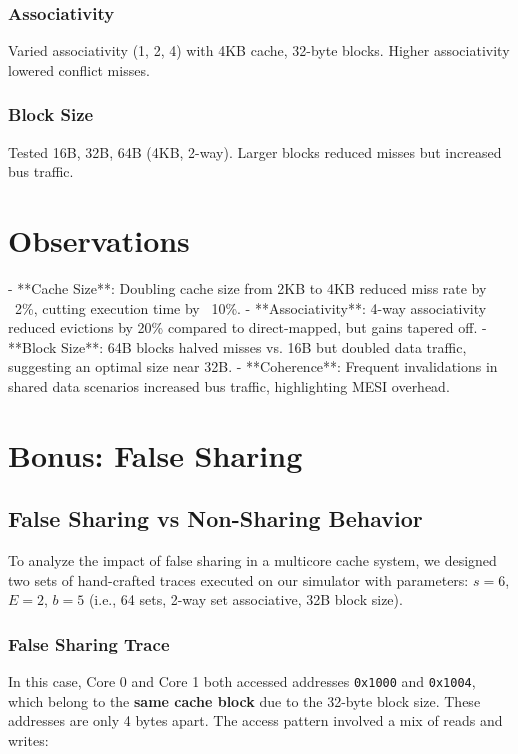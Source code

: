 \documentclass{article}
\begin{document}
\subsubsection{Associativity}

Varied associativity (1, 2, 4) with 4KB cache, 32-byte blocks. Higher associativity lowered conflict misses.

\subsubsection{Block Size}

Tested 16B, 32B, 64B (4KB, 2-way). Larger blocks reduced misses but increased bus traffic.

\section{Observations}

- **Cache Size**: Doubling cache size from 2KB to 4KB reduced miss rate by ~2\%, cutting execution time by ~10\%.
- **Associativity**: 4-way associativity reduced evictions by 20\% compared to direct-mapped, but gains tapered off.
- **Block Size**: 64B blocks halved misses vs. 16B but doubled data traffic, suggesting an optimal size near 32B.
- **Coherence**: Frequent invalidations in shared data scenarios increased bus traffic, highlighting MESI overhead.

\section{Bonus: False Sharing}
\subsection{False Sharing vs Non-Sharing Behavior}

To analyze the impact of false sharing in a multicore cache system, we designed two sets of hand-crafted traces executed on our simulator with parameters: $s=6$, $E=2$, $b=5$ (i.e., 64 sets, 2-way set associative, 32B block size).

\subsubsection{False Sharing Trace}

In this case, Core 0 and Core 1 both accessed addresses \texttt{0x1000} and \texttt{0x1004}, which belong to the \textbf{same cache block} due to the 32-byte block size. These addresses are only 4 bytes apart. The access pattern involved a mix of reads and writes:
\end{document}
